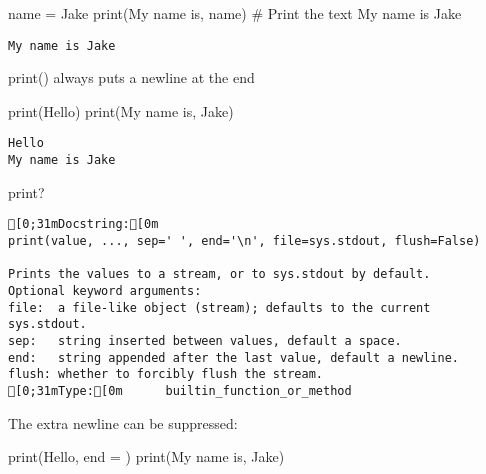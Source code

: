 \documentclass[
  letterpaper,
  DIV=11,
  numbers=noendperiod]{scrreprt}
\newenvironment{Shaded}{\begin{snugshade}}{\end{snugshade}}
\newcommand{\BuiltInTok}[1]{\textcolor[rgb]{0.00,0.46,0.62}{#1}}
\newcommand{\BuiltInTok}[1]{\textcolor[rgb]{0.00,0.48,0.65}{#1}}
\newcommand{\CommentTok}[1]{\textcolor[rgb]{0.37,0.37,0.37}{#1}}
\newcommand{\NormalTok}[1]{\textcolor[rgb]{0.00,0.46,0.62}{#1}}
\newcommand{\OperatorTok}[1]{\textcolor[rgb]{0.37,0.37,0.37}{#1}}
\newcommand{\NormalTok}[1]{\textcolor[rgb]{0.00,0.48,0.65}{#1}}
\newcommand{\OperatorTok}[1]{\textcolor[rgb]{0.37,0.37,0.37}{#1}}
\newcommand{\StringTok}[1]{\textcolor[rgb]{0.13,0.47,0.30}{#1}}
\begin{document}
\begin{Shaded}
\begin{Highlighting}[]
\begin{Shaded}
\begin{Highlighting}[]
\NormalTok{name }\OperatorTok{=} \StringTok{\textquotesingle{}Jake\textquotesingle{}}
\BuiltInTok{print}\NormalTok{(}\StringTok{\textquotesingle{}My name is\textquotesingle{}}\NormalTok{, name) }\CommentTok{\# Print the text \textquotesingle{}My name is Jake\textquotesingle{}}
\end{Highlighting}
\end{Shaded}

\begin{verbatim}
My name is Jake
\end{verbatim}

print() always puts a newline at the end

\begin{Shaded}
\begin{Highlighting}[]
\BuiltInTok{print}\NormalTok{(}\StringTok{\textquotesingle{}Hello\textquotesingle{}}\NormalTok{)}
\BuiltInTok{print}\NormalTok{(}\StringTok{\textquotesingle{}My name is\textquotesingle{}}\NormalTok{, }\StringTok{\textquotesingle{}Jake\textquotesingle{}}\NormalTok{)}
\end{Highlighting}
\end{Shaded}

\begin{verbatim}
Hello
My name is Jake
\end{verbatim}

\begin{Shaded}
\begin{Highlighting}[]
\BuiltInTok{print}\NormalTok{?}
\end{Highlighting}
\end{Shaded}

\begin{verbatim}
[0;31mDocstring:[0m
print(value, ..., sep=' ', end='\n', file=sys.stdout, flush=False)

Prints the values to a stream, or to sys.stdout by default.
Optional keyword arguments:
file:  a file-like object (stream); defaults to the current sys.stdout.
sep:   string inserted between values, default a space.
end:   string appended after the last value, default a newline.
flush: whether to forcibly flush the stream.
[0;31mType:[0m      builtin_function_or_method
\end{verbatim}

The extra newline can be suppressed:

\begin{Shaded}
\begin{Highlighting}[]
\BuiltInTok{print}\NormalTok{(}\StringTok{\textquotesingle{}Hello\textquotesingle{}}\NormalTok{, end }\OperatorTok{=} \StringTok{\textquotesingle{}\textquotesingle{}}\NormalTok{)}
\BuiltInTok{print}\NormalTok{(}\StringTok{\textquotesingle{}My name is\textquotesingle{}}\NormalTok{, }\StringTok{\textquotesingle{}Jake\textquotesingle{}}\NormalTok{)}
\end{Highlighting}
\end{Shaded}


\end{Highlighting}
\end{Shaded}
\end{document}
